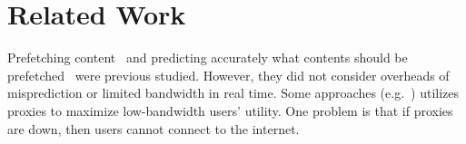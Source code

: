 \section{Related Work}
\label{sec:related}

Prefetching content~\cite{padmanabhan1996using, jiang1998web} and predicting accurately what contents should be prefetched~\cite{palpanas1998web, nanopoulos2003data, chen2003popularity} were previous studied. However, they did not consider overheads of misprediction or limited bandwidth in real time. Some approaches (e.g.~\cite{fan1999web}) utilizes proxies to maximize low-bandwidth users' utility. One problem is that if proxies are down, then users cannot connect to the internet.
